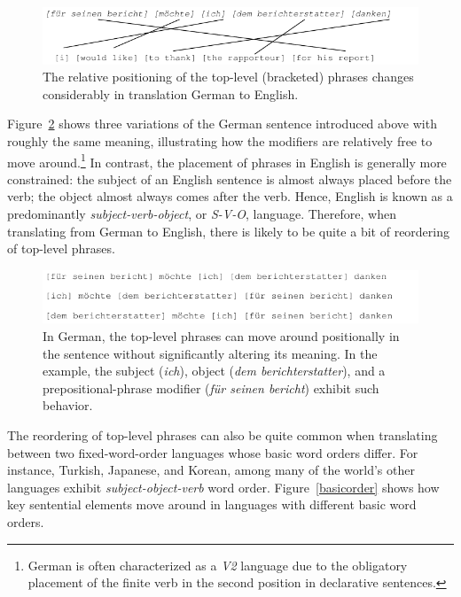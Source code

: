 \documentclass[11pt]{report}
\theoremstyle{plain}
\begin{document}
{\begin{figure}
\centering
\includegraphics[scale=1]{brooke-movement}
\caption{The relative positioning of the top-level (bracketed) phrases
changes considerably in translation German to English.}
\label{movement}
\end{figure}

Figure~\ref{freeorder} shows three variations of the German sentence
introduced above with roughly the same meaning, illustrating how the
modifiers are relatively free to move around.\footnote{German is often
characterized as a {\em V2} language due to the obligatory placement
of the finite verb in the second position in declarative sentences.}
In contrast, the placement of phrases in English is generally more
constrained: the subject of an English sentence is almost always
placed before the verb; the object almost always comes after the
verb. Hence, English is known as a predominantly {\em
subject-verb-object}, or {\em S-V-O}, language. Therefore, when
translating from German to English, there is likely to be quite a bit
of reordering of top-level phrases.

\begin{figure}
\centering
\includegraphics[scale=1]{brooke-freeorder}
\caption{In German, the top-level phrases can move around positionally
in the sentence without significantly altering its meaning. In the
example, the subject ({\em ich}), object ({\em dem berichterstatter}),
and a prepositional-phrase modifier ({\em f\"{u}r seinen bericht})
exhibit such behavior.}
\label{freeorder}
\end{figure}

The reordering of top-level phrases can also be quite common when
translating between two fixed-word-order languages whose basic word
orders differ. For instance, Turkish, Japanese, and Korean, among many
of the world's other languages exhibit {\em subject-object-verb} word
order. Figure~\ref{basicorder} shows how key sentential elements move
around in languages with different basic word orders.

}
\end{document}
